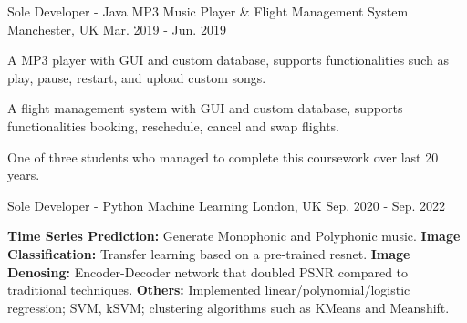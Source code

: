 \begin{cventries}
\cventry
  {Sole Developer - Java} %
  {MP3 Music Player \& Flight Management System} %
  {Manchester, UK} %
  {Mar. 2019 - Jun. 2019} %
  {
    \begin{cvitems} %
      \item {A MP3 player with GUI and custom database, supports functionalities such as play, pause, restart, and upload custom songs.}
      \item {A flight management system with GUI and custom database, supports functionalities booking, reschedule, cancel and swap flights.}
      \item {One of three students who managed to complete this coursework over last 20 years.}
    \end{cvitems}
  }
    
  \cventry
    {Sole Developer - Python} %
    {Machine Learning} %
    {London, UK} %
    {Sep. 2020 - Sep. 2022} %
    {
      \begin{cvitems} %
        \item {\textbf{Time Series Prediction:} Generate Monophonic and Polyphonic music. \textbf{Image Classification:} Transfer learning based on a pre-trained resnet. \textbf{Image Denosing:} Encoder-Decoder network that doubled PSNR compared to traditional techniques. \textbf{Others:} Implemented linear/polynomial/logistic regression; SVM, kSVM; clustering algorithms such as KMeans and Meanshift.}
      \end{cvitems}
    }
    



\end{cventries}
